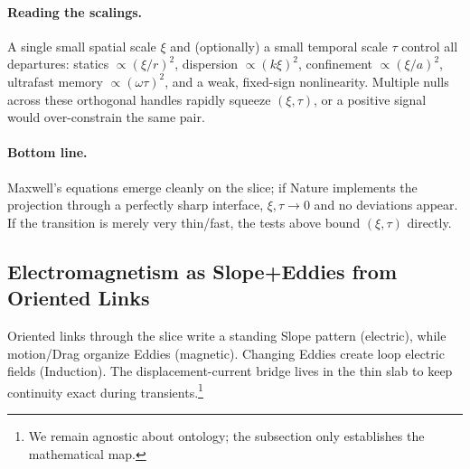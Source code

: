 \paragraph{Reading the scalings.}
A single small spatial scale $\xi$ and (optionally) a small temporal scale $\tau$ control all departures: statics $\propto(\xi/r)^2$, dispersion $\propto(k\xi)^2$, confinement $\propto(\xi/a)^2$, ultrafast memory $\propto(\omega\tau)^2$, and a weak, fixed-sign nonlinearity. Multiple nulls across these orthogonal handles rapidly squeeze $(\xi,\tau)$, or a positive signal would over-constrain the same pair.

\paragraph{Bottom line.}
Maxwell's equations emerge cleanly on the slice; if Nature implements the projection through a perfectly sharp interface, $\xi,\tau\!\to\!0$ and no deviations appear. If the transition is merely very thin/fast, the tests above bound $(\xi,\tau)$ directly.

\subsection{Electromagnetism as Slope+Eddies from Oriented Links}
\label{sec:EM-from-helical-vortices}

\begin{tcolorbox}[title=Plain-language snapshot (30 seconds)]
Oriented links through the slice write a standing Slope pattern (electric), while motion/Drag organize Eddies (magnetic). Changing Eddies create loop electric fields (Induction). The displacement-current bridge lives in the thin slab to keep continuity exact during transients.\footnote{We remain agnostic about ontology; the subsection only establishes the mathematical map.}
\end{tcolorbox}

